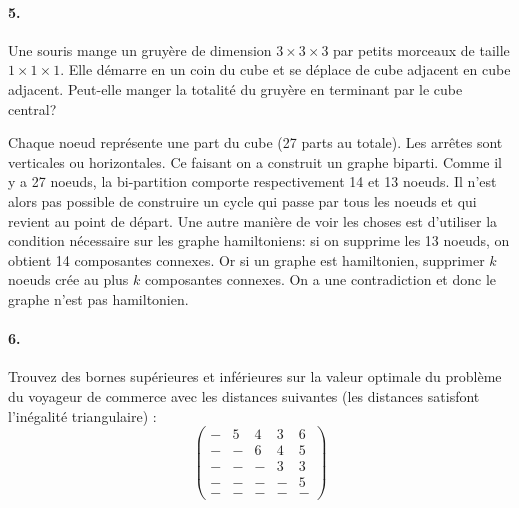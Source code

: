\paragraph{5. } Une souris mange un gruyère de dimension $3 \times 3 \times 3$ par petits morceaux de taille $1 \times 1 \times 1$. Elle démarre en un coin du cube et se déplace de cube adjacent en cube adjacent. Peut-elle manger la totalité du gruyère en terminant par le cube central?

\begin{solution}
Chaque noeud représente une part du cube (27 parts au totale). Les arrêtes sont verticales ou horizontales. Ce faisant on a construit un graphe biparti. Comme il y a 27 noeuds, la bi-partition comporte respectivement 14 et 13 noeuds. Il n'est alors pas possible de construire un cycle qui passe par tous les noeuds et qui revient au point de départ. Une autre manière de voir les choses est d'utiliser la condition nécessaire sur les graphe hamiltoniens: si on supprime les 13 noeuds, on obtient 14 composantes connexes. Or si un graphe est hamiltonien, supprimer $k$ noeuds crée au plus $k$ composantes connexes. On a une contradiction et donc le graphe n'est pas hamiltonien.
\end{solution}

\paragraph{6. } Trouvez des bornes supérieures et inférieures sur la valeur optimale du problème du voyageur de commerce avec les distances suivantes (les distances satisfont l'inégalité triangulaire) :
\begin{equation}
  \left( \begin{matrix}
      - & 5 & 4 & 3 & 6 \\
      - & - & 6 & 4 & 5 \\
      - & - & - & 3 & 3 \\
      - & - & - & - & 5 \\
      - & - & - & - & -
  \end{matrix}  \right)
\end{equation}

